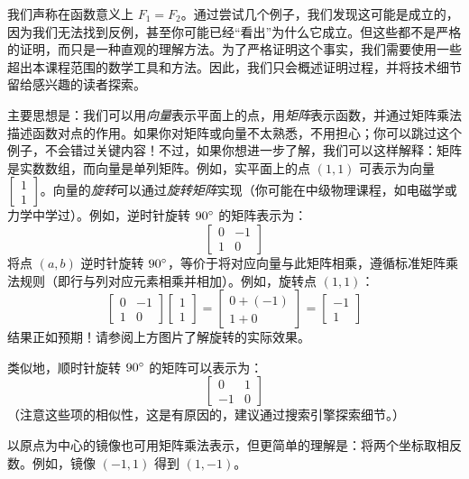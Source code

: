 \begin{example}
    我们声称在函数意义上 $F_1 = F_2$。通过尝试几个例子，我们发现这可能是成立的，因为我们无法找到反例，甚至你可能已经``看出''为什么它成立。但这些都不是严格的证明，而只是一种直观的理解方法。为了严格证明这个事实，我们需要使用一些超出本课程范围的数学工具和方法。因此，我们只会概述证明过程，并将技术细节留给感兴趣的读者探索。

    主要思想是：我们可以用\emph{向量}表示平面上的点，用\emph{矩阵}表示函数，并通过矩阵乘法描述函数对点的作用。如果你对矩阵或向量不太熟悉，不用担心；你可以跳过这个例子，不会错过关键内容！不过，如果你想进一步了解，我们可以这样解释：矩阵是实数数组，而向量是单列矩阵。例如，实平面上的点 $(1, 1)$ 可表示为向量 $\begin{bmatrix}
        1 \\
        1
     \end{bmatrix}$。向量的\emph{旋转}可以通过\emph{旋转矩阵}实现（你可能在中级物理课程，如电磁学或力学中学过）。例如，逆时针旋转 $90 ^\circ$ 的矩阵表示为：
     \[\begin{bmatrix}
        0 & -1 \\
        1 & 0
     \end{bmatrix}\]
     将点 $(a, b)$ 逆时针旋转 $90 ^\circ$，等价于将对应向量与此矩阵相乘，遵循标准矩阵乘法规则（即行与列对应元素相乘并相加）。例如，旋转点 $(1, 1)$：
     \[\begin{bmatrix}
        0 & -1 \\
        1 & 0
     \end{bmatrix}\begin{bmatrix}
        1 \\
        1
     \end{bmatrix} = \begin{bmatrix}
        0+(-1) \\
        1+0
     \end{bmatrix}=\begin{bmatrix}
        -1 \\
        1
     \end{bmatrix}\]
     结果正如预期！请参阅上方图片了解旋转的实际效果。

     类似地，顺时针旋转 $90 ^\circ$ 的矩阵可以表示为：
     \[\begin{bmatrix}
        0 & 1 \\
        -1 & 0
     \end{bmatrix}\]
     （注意这些项的相似性，这是有原因的，建议通过搜索引擎探索细节。）

   以原点为中心的镜像也可用矩阵乘法表示，但更简单的理解是：将两个坐标取相反数。例如，镜像 $(-1, 1)$ 得到 $(1, -1)$。


\end{example}
